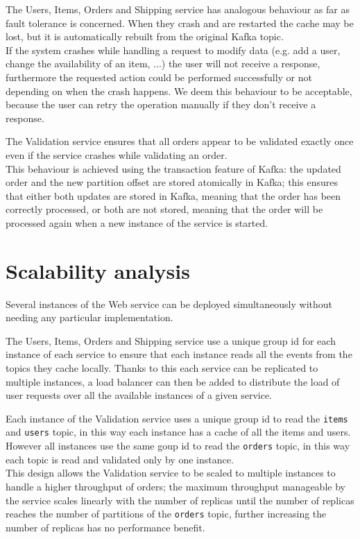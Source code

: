 \documentclass{article}
\begin{document}
The Users, Items, Orders and Shipping service has analogous behaviour as far as fault tolerance is concerned. When they crash and are restarted the cache may be lost, but it is automatically rebuilt from the original Kafka topic.\\
If the system crashes while handling a request to modify data (e.g. add a user, change the availability of an item, ...) the user will not receive a response, furthermore the requested action could be performed successfully or not depending on when the crash happens. We deem this behaviour to be acceptable, because the user can retry the operation manually if they don't receive a response.

The Validation service ensures that all orders appear to be validated exactly once even if the service crashes while validating an order.\\
This behaviour is achieved using the transaction feature of Kafka: the updated order and the new partition offset are stored atomically in Kafka; this ensures that either both updates are stored in Kafka, meaning that the order has been correctly processed, or both are not stored, meaning that the order will be processed again when a new instance of the service is started.

\section{Scalability analysis}
Several instances of the Web service can be deployed simultaneously without needing any particular implementation.

The Users, Items, Orders and Shipping service use a unique group id for each instance of each service to ensure that each instance reads all the events from the topics they cache locally. Thanks to this each service can be replicated to multiple instances, a load balancer can then be added to distribute the load of user requests over all the available instances of a given service.

Each instance of the Validation service uses a unique group id to read the \texttt{items} and \texttt{users} topic, in this way each instance has a cache of all the items and users. However all instances use the same goup id to read the \texttt{orders} topic, in this way each topic is read and validated only by one instance.\\
This design allows the Validation service to be scaled to multiple instances to handle a higher throughput of orders; the maximum throughput manageable by the service scales linearly with the number of replicas until the number of replicas reaches the number of partitions of the \texttt{orders} topic, further increasing the number of replicas has no performance benefit.
\end{document}
